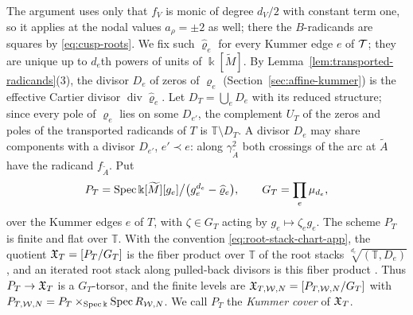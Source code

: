 The argument uses only that $f_V$ is monic of degree $d_V/2$ with constant
term one, so it applies at the nodal values $a_\rho=\pm2$ as well; there the
$B$-radicands are squares by \eqref{eq:cusp-roots}.  We fix such
$\widehat\varrho_e$ for every Kummer edge $e$ of $\mathcal T$; they are unique up to
$d_e$th powers of units of $\Bbbk[\widetilde M]$.  By
Lemma~\ref{lem:transported-radicands}(3), the divisor $D_e$ of zeros of
$\varrho_e$ (Section~\ref{sec:affine-kummer}) is the effective Cartier
divisor $\operatorname{div}\widehat\varrho_e$.  Let $D_T=\bigcup_eD_e$ with
its reduced structure; since every pole of $\varrho_e$ lies on
some $D_{e'}$, the complement $U_T$ of the zeros and poles of the
transported radicands of $T$ is $\mathbb T\setminus D_T$.  A divisor $D_e$
may share components with a divisor $D_{e'}$, $e'\prec e$: along
$\gamma_{\widetilde A}^2$ both crossings of the arc at $\widetilde A$ have the
radicand $f_{\widetilde A}$.  Put
\[
 P_T=\operatorname{Spec}\Bbbk[\widetilde M][g_e]\big/\bigl(g_e^{d_e}-\widehat\varrho_e\bigr),
 \qquad
 G_T=\prod_e\mu_{d_e},
\]
over the Kummer edges $e$ of $T$, with $\zeta\in G_T$ acting by
$g_e\mapsto\zeta_eg_e$.  The scheme $P_T$ is finite and flat
over $\mathbb T$.  With the convention \eqref{eq:root-stack-chart-app}, the quotient
$\mathfrak X_T=[P_T/G_T]$ is the fiber product over $\mathbb T$ of the root stacks
$\sqrt[d_e]{(\mathbb T,D_e)}$, and an iterated root stack along
pulled-back divisors is this fiber product \cite[Def.~2.6]{cadman2007}.
Thus $P_T\to\mathfrak X_T$ is a $G_T$-torsor, and the finite levels are
$\mathfrak X_{T,\mathcal W,N}=[P_{T,\mathcal W,N}/G_T]$ with
$P_{T,\mathcal W,N}=P_T\times_{\operatorname{Spec}\Bbbk}\operatorname{Spec} R_{\mathcal W,N}$.  We call $P_T$ the
\emph{Kummer cover} of $\mathfrak X_T$.

